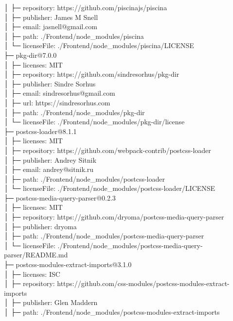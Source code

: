│  ├─ repository: https://github.com/piscinajs/piscina\\
│  ├─ publisher: James M Snell\\
│  ├─ email: jasnell@gmail.com\\
│  ├─ path: ./Frontend/node\_modules/piscina\\
│  └─ licenseFile: ./Frontend/node\_modules/piscina/LICENSE\\
├─ pkg-dir@7.0.0\\
│  ├─ licenses: MIT\\
│  ├─ repository: https://github.com/sindresorhus/pkg-dir\\
│  ├─ publisher: Sindre Sorhus\\
│  ├─ email: sindresorhus@gmail.com\\
│  ├─ url: https://sindresorhus.com\\
│  ├─ path: ./Frontend/node\_modules/pkg-dir\\
│  └─ licenseFile: ./Frontend/node\_modules/pkg-dir/license\\
├─ postcss-loader@8.1.1\\
│  ├─ licenses: MIT\\
│  ├─ repository: https://github.com/webpack-contrib/postcss-loader\\
│  ├─ publisher: Andrey Sitnik\\
│  ├─ email: andrey@sitnik.ru\\
│  ├─ path: ./Frontend/node\_modules/postcss-loader\\
│  └─ licenseFile: ./Frontend/node\_modules/postcss-loader/LICENSE\\
├─ postcss-media-query-parser@0.2.3\\
│  ├─ licenses: MIT\\
│  ├─ repository: https://github.com/dryoma/postcss-media-query-parser\\
│  ├─ publisher: dryoma\\
│  ├─ path: ./Frontend/node\_modules/postcss-media-query-parser\\
│  └─ licenseFile: ./Frontend/node\_modules/postcss-media-query-parser/README.md\\
├─ postcss-modules-extract-imports@3.1.0\\
│  ├─ licenses: ISC\\
│  ├─ repository: https://github.com/css-modules/postcss-modules-extract-imports\\
│  ├─ publisher: Glen Maddern\\
│  ├─ path: ./Frontend/node\_modules/postcss-modules-extract-imports\\
